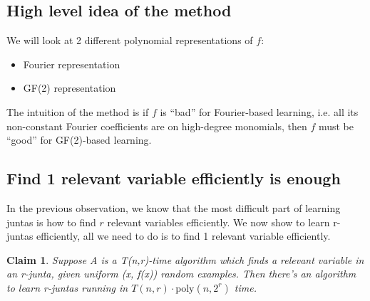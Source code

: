 \documentclass[12pt]{article}
\newtheorem{claim}[theorem]{Claim}
\newcommand{\poly}{\mathrm{poly}}
\begin{document}
\subsection{High level idea of the method}

We will look at 2 different polynomial representations of $f$:

\begin{itemize}
\item Fourier representation
\item GF(2) representation
\end{itemize}

The intuition of the method is if $f$ is ``bad'' for Fourier-based
learning, i.e. all its non-constant Fourier coefficients are on
high-degree monomials, then $f$ must be ``good'' for GF(2)-based
learning.

\subsection{Find 1 relevant variable efficiently is enough}

In the previous observation, we know that the most difficult part of
learning juntas is how to find $r$ relevant variables efficiently. We
now show to learn r-juntas efficiently, all we need to do is to find 1
relevant variable efficiently.

\begin{claim}
Suppose A is a T(n,r)-time algorithm which finds a relevant variable
in an r-junta, given uniform (x, f(x)) random examples. Then there's
an algorithm to learn r-juntas running in $T(n,r) \cdot \poly (n,
2^r)$ time.
\end{claim}
\end{document}
